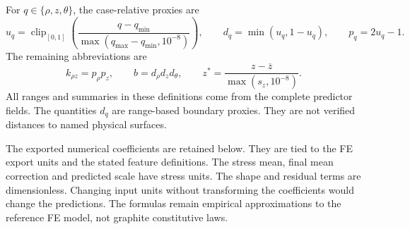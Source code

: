 For $q\in\{\rho,z,\theta\}$, the case-relative proxies are
\begin{equation}
u_q=\operatorname{clip}_{[0,1]}
\left(\frac{q-q_{\min}}{\max(q_{\max}-q_{\min},10^{-8})}\right),
\qquad d_q=\min(u_q,1-u_q),\qquad p_q=2u_q-1.
\end{equation}
The remaining abbreviations are
\begin{equation}
k_{\rho z}=p_\rho p_z,
\qquad b=d_\rho d_z d_\theta,
\qquad z^{*}=\frac{z-\overline z}{\max(s_z,10^{-8})}.
\end{equation}
All ranges and summaries in these definitions come from the complete predictor fields. The quantities $d_q$ are range-based boundary proxies. They are not verified distances to named physical surfaces.

The exported numerical coefficients are retained below. They are tied to the FE export units and the stated feature definitions. The stress mean, final mean correction and predicted scale have stress units. The shape and residual terms are dimensionless. Changing input units without transforming the coefficients would change the predictions. The formulas remain empirical approximations to the reference FE model, not graphite constitutive laws.

\begingroup
\small
\allowdisplaybreaks[1]
